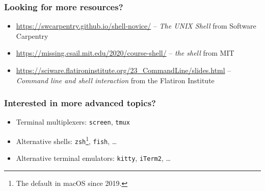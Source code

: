 \documentclass[aspectratio=169]{beamer}
\begin{document}
\begin{frame}
	\frametitle{Looking for more resources?}
	\begin{itemize}
		\item \url{https://swcarpentry.github.io/shell-novice/} -- \textit{The UNIX Shell} from Software Carpentry
		\item \url{https://missing.csail.mit.edu/2020/course-shell/} -- \textit{the shell} from MIT
		\item \url{https://sciware.flatironinstitute.org/23_CommandLine/slides.html} -- \textit{Command line and shell interaction} from the Flatiron Institute
	\end{itemize}
\end{frame}

\begin{frame}
	\frametitle{Interested in more advanced topics?}
	\begin{itemize}
		\item Terminal multiplexers: \texttt{screen}, \texttt{tmux}
		\item Alternative shells: \texttt{zsh}\footnote{The default in macOS since 2019.}, \texttt{fish}, \dots
		\item Alternative terminal emulators: \texttt{kitty}, \texttt{iTerm2}, \dots
	\end{itemize}
\end{frame}
\end{document}
